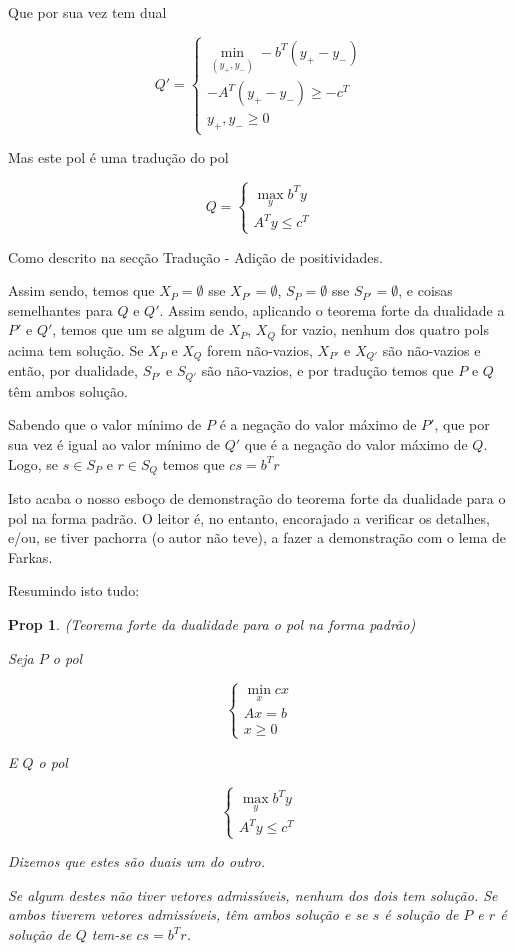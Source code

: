 \documentclass{article}
\newtheorem{prop}{Prop}
\theoremstyle{definition}
\begin{document}
	Que por sua vez tem dual
	
	\[
	Q' =
	\begin{cases}
	\min\limits_{(y_+,y_-)} -b^T (y_+ - y_-)\\
	-A^T (y_+ - y_-) \geq -c^T\\
	y_+, y_- \geq 0
	\end{cases}
	\]
	
	Mas este pol é uma tradução do pol
	
	\[
	Q =
	\begin{cases}
	\max\limits_y b^T y\\
	A^T y \leq c^T
	\end{cases}
	\]
	
	Como descrito na secção Tradução - Adição de positividades.
	
	Assim sendo, temos que $X_P = \emptyset$ sse $X_{P'} = \emptyset$, $S_P = \emptyset$ sse $S_{P'} = \emptyset$, e coisas semelhantes para $Q$ e $Q'$. Assim sendo, aplicando o teorema forte da dualidade a $P'$ e $Q'$, temos que um se algum de $X_P$, $X_Q$ for vazio, nenhum dos quatro pols acima tem solução. Se $X_P$ e $X_Q$ forem não-vazios, $X_{P'}$ e $X_{Q'}$ são não-vazios e então, por dualidade, $S_{P'}$ e $S_{Q'}$ são não-vazios, e por tradução temos que $P$ e $Q$ têm ambos solução.
	
	Sabendo que o valor mínimo de $P$ é a negação do valor máximo de $P'$, que por sua vez é igual ao valor mínimo de $Q'$ que é a negação do valor máximo de $Q$. Logo, se $s \in S_P$ e $r \in S_Q$ temos que $cs = b^T r$
	
	Isto acaba o nosso esboço de demonstração do teorema forte da dualidade para o pol na forma padrão. O leitor é, no entanto, encorajado a verificar os detalhes, e/ou, se tiver pachorra (o autor não teve), a fazer a demonstração com o lema de Farkas.
	
	Resumindo isto tudo:
	
	\begin{prop} (Teorema forte da dualidade para o pol na forma padrão)
	
	Seja $P$ o pol
	
	\[
	\begin{cases}
	\min\limits_x cx\\
	Ax = b\\
	x \geq 0
	\end{cases}
	\]
	
	E $Q$ o pol
	
	\[
	\begin{cases}
	\max\limits_y b^T y\\
	A^T y \leq c^T
	\end{cases}
	\]
	
	Dizemos que estes são duais um do outro.
	
	Se algum destes não tiver vetores admissíveis, nenhum dos dois tem solução. Se ambos tiverem vetores admissíveis, têm ambos solução e se $s$ é solução de $P$ e $r$ é solução de $Q$ tem-se $cs = b^T r$.
	\end{prop}
	
\end{document}
